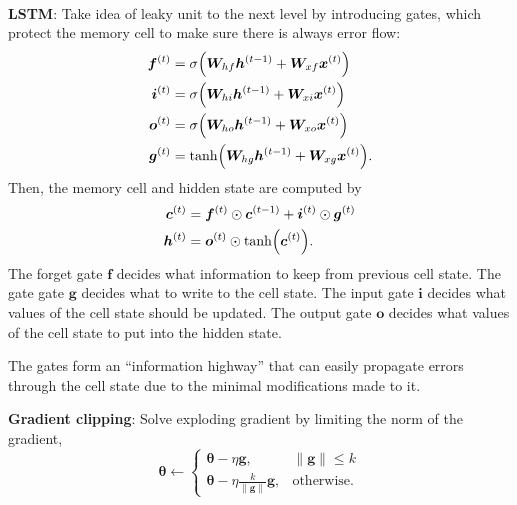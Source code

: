 \documentclass{article}
\newcommand{\lft}{\mathopen{}\mathclose\bgroup\left}
\newcommand{\rgt}{\aftergroup\egroup\right}
\renewcommand{\vec}[1]{\bm{#1}}
\newcommand{\mat}[1]{\bm{#1}}
\newenvironment{topic}[1]
{\textbf{\sffamily \colorbox{black}{\rlap{\textbf{\textcolor{white}{#1}}}\hspace{\linewidth}\hspace{-2\fboxsep}}} \\ \vspace{0.2cm}}
{}
\begin{document}
\begin{multicols*}{2}
\begin{topic}{Recurrent neural networks}
        \textbf{LSTM}: Take idea of leaky unit to the next level by introducing gates, which protect the memory cell to make sure there is always error flow:
        \begin{align*}
            \vec{f}^{(t)} & = \sigma \lft( \mat{W}_{hf} \vec{h}^{(t-1)} + \mat{W}_{xf} \vec{x}^{(t)} \rgt) \\
            \vec{i}^{(t)} & = \sigma \lft( \mat{W}_{hi} \vec{h}^{(t-1)} + \mat{W}_{xi} \vec{x}^{(t)} \rgt) \\
            \vec{o}^{(t)} & = \sigma \lft( \mat{W}_{ho} \vec{h}^{(t-1)} + \mat{W}_{xo} \vec{x}^{(t)} \rgt) \\
            \vec{g}^{(t)} & = \tanh \lft( \mat{W}_{hg} \vec{h}^{(t-1)} + \mat{W}_{xg} \vec{x}^{(t)} \rgt).
        \end{align*}
        Then, the memory cell and hidden state are computed by
        \begin{align*}
            \vec{c}^{(t)} & = \vec{f}^{(t)} \odot \vec{c}^{(t-1)} + \vec{i}^{(t)} \odot \vec{g}^{(t)} \\
            \vec{h}^{(t)} & = \vec{o}^{(t)} \odot \tanh \lft( \vec{c}^{(t)} \rgt).
        \end{align*}
        The forget gate $\vec{f}$ decides what information to keep from previous cell state. The gate
        gate $\vec{g}$ decides what to write to the cell state. The input gate $\vec{i}$ decides what
        values of the cell state should be updated. The output gate $\vec{o}$ decides what values of
        the cell state to put into the hidden state.

        The gates form an ``information highway'' that can easily propagate errors through the cell state
        due to the minimal modifications made to it.

        \textbf{Gradient clipping}: Solve exploding gradient by limiting the norm of the gradient, \[
            \vec{\theta} \gets \begin{cases}
                \vec{\theta} - \eta \vec{g},                         & \| \vec{g} \| \leq k \\
                \vec{\theta} - \eta \frac{k}{\| \vec{g} \|} \vec{g}, & \text{otherwise}.
            \end{cases}
        \]

    \end{topic}

    \begin{topic}{Autoencoders}


\end{topic}
\end{multicols*}
\end{document}
